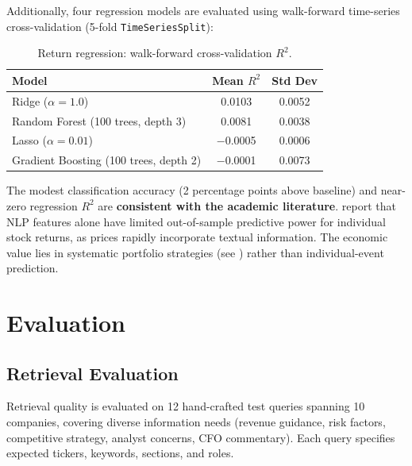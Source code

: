 \documentclass[12pt,a4paper]{article}
\begin{document}
Additionally, four regression models are evaluated using walk-forward time-series cross-validation (5-fold \texttt{TimeSeriesSplit}):

\begin{table}[H]
\centering
\caption{Return regression: walk-forward cross-validation $R^2$.}
\label{tab:ml-r2}
\begin{tabular}{@{}lcc@{}}
\toprule
\textbf{Model} & \textbf{Mean $R^2$} & \textbf{Std Dev} \\
\midrule
Ridge ($\alpha = 1.0$) & 0.0103 & 0.0052 \\
Random Forest (100 trees, depth 3) & 0.0081 & 0.0038 \\
Lasso ($\alpha = 0.01$) & $-$0.0005 & 0.0006 \\
Gradient Boosting (100 trees, depth 2) & $-$0.0001 & 0.0073 \\
\bottomrule
\end{tabular}
\end{table}

The modest classification accuracy (2 percentage points above baseline) and near-zero regression $R^2$ are \textbf{consistent with the academic literature}. \citet{chen2018sentimental} report that NLP features alone have limited out-of-sample predictive power for individual stock returns, as prices rapidly incorporate textual information. The economic value lies in systematic portfolio strategies (see ) rather than individual-event prediction.


\section{Evaluation}
\label{sec:evaluation}

\subsection{Retrieval Evaluation}

Retrieval quality is evaluated on 12 hand-crafted test queries spanning 10 companies, covering diverse information needs (revenue guidance, risk factors, competitive strategy, analyst concerns, CFO commentary). Each query specifies expected tickers, keywords, sections, and roles.
\end{document}
